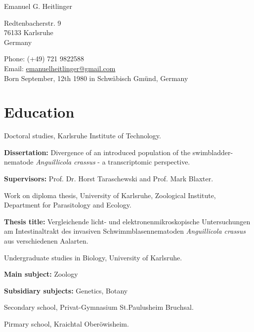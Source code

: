 \documentclass[10pt,letterpaper]{article}
\def\name{Emanuel G. Heitlinger}
\renewenvironment{itemize}{
  \begin{list}{}{
    \setlength{\leftmargin}{1.5em}
    \setlength{\itemsep}{0.25em}
    \setlength{\parskip}{0pt}
    \setlength{\parsep}{0.25em}
  }
}{
  \end{list}
}
\begin{document}
{\huge \name}


\bigskip

\begin{minipage}[t]{0.5\textwidth}
  Redtenbacherstr. 9 \\
  76133 Karlsruhe \\
  Germany
\end{minipage}
\begin{minipage}[t]{0.5\textwidth}
  Phone: (+49) 721 9822588 \\
  Email: \href{mailto:emanuelheitlinger@gmail.com}{emanuelheitlinger@gmail.com} \\
  Born September, 12th 1980 in Schw\"abisch Gm\"und, Germany\\
\end{minipage}


\section*{Education}

\begin{itemize}
\item [2008-2012] Doctoral studies, Karlsruhe Institute of Technology.
  \begin{itemize}
  \item \textbf{Dissertation:} Divergence of an introduced population
    of the swimbladder-nematode \textit{Anguillicola crassus} - a
    transcriptomic perspective.
  \item \textbf{Supervisors:}
    Prof. Dr. Horst Taraschewski and Prof. Mark Blaxter.
  \end{itemize}
\item [2007-2008] Work on diploma thesis, University of Karlsruhe,
  Zoological Institute, Department for Parasitology and Ecology.
  \begin{itemize}
  \item \textbf{Thesis title:} Vergleichende licht- und
    elektronenmikroskopische Untersuchungen am Intestinaltrakt des
    invasiven Schwimmblasennematoden \textit{Anguillicola crassus} aus
    verschiedenen Aalarten.
  \end{itemize}
\item [2001-2007] Undergraduate studies in Biology, University of
  Karlsruhe.
  \begin{itemize}
  \item \textbf{Main subject:} Zoology
  \item \textbf{Subsidiary subjects:} Genetics, Botany
  \end{itemize}
\item [1991-2000] Secondary school, Privat-Gymnasium St.Paulusheim
  Bruchsal.
\item [1987-1991] Pirmary school, Kraichtal Ober\"owisheim.
\end{itemize}
\end{document}
